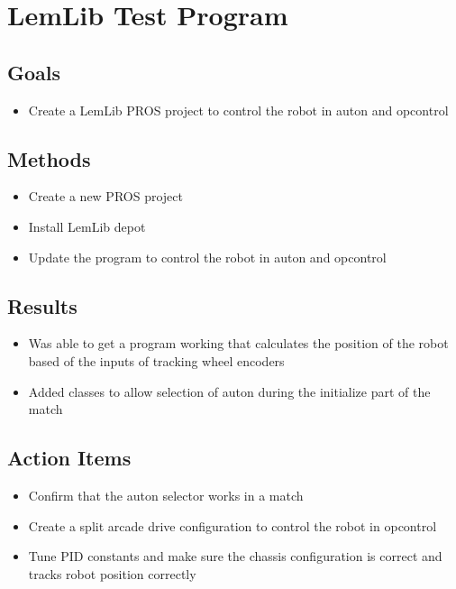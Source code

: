 \section{LemLib Test Program}

\subsection{Goals}
\begin{itemize}
    \item Create a LemLib PROS project to control the robot in auton and opcontrol
\end{itemize}

\subsection{Methods}
\begin{itemize}
    \item Create a new PROS project
    \item Install LemLib depot
    \item Update the program to control the robot in auton and opcontrol
\end{itemize}

\subsection{Results}
\begin{itemize}
    \item Was able to get a program working that calculates the position of the robot based of the inputs of tracking wheel encoders
    \item Added classes to allow selection of auton during the initialize part of the match
\end{itemize}

\subsection{Action Items}
\begin{itemize}
    \item Confirm that the auton selector works in a match
    \item Create a split arcade drive configuration to control the robot in opcontrol
    \item Tune PID constants and make sure the chassis configuration is correct and tracks robot position correctly
\end{itemize}